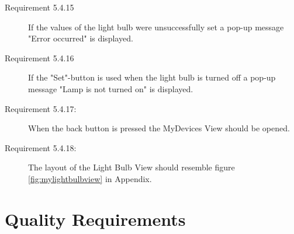 \documentclass[a4paper]{article}
\begin{document}
\begin{description}
\item[Requirement 5.4.15] If the values of the light bulb were unsuccessfully set a pop-up message "Error occurred" is displayed.

\item[Requirement 5.4.16] If the "Set"-button is used when the light bulb is turned off a pop-up message "Lamp is not turned on" is displayed.

\item[Requirement 5.4.17:] When the back button is pressed the MyDevices View should be opened.

\item[Requirement 5.4.18:] The layout of the Light Bulb View should resemble figure \ref{fig:mylightbulbview} in Appendix.

\end{description}

\section{Quality Requirements}
\end{document}

